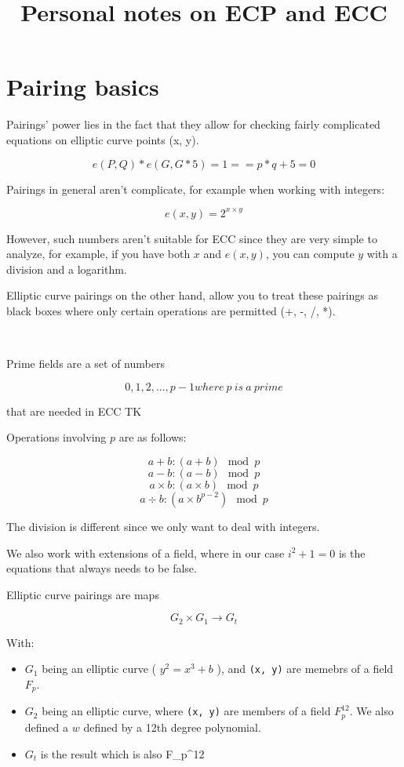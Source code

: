 \documentclass{article}
\title{Personal notes on ECP and ECC}
\newcommand{\inl}[1]{\lstinline{#1}}
\begin{document}
\maketitle


\section{Pairing basics}

Pairings' power lies in the fact that they allow for checking fairly complicated equations on elliptic curve points (x, y).

\[e (P, Q) * e (G, G * 5) = 1 == p * q + 5 = 0 \]

Pairings in general aren't complicate, for example when working with integers:

\[ e (x, y) = 2^{ x \times y } \]

However, such numbers aren't suitable for ECC since they are very simple to analyze, for example, if you have both \( x \) and \( e (x, y) \), you can compute \( y \) with a division and a logarithm.

Elliptic curve pairings on the other hand, allow you to treat these pairings as black boxes where only certain operations are permitted (+, -, /, *).

\

Prime fields are a set of numbers

\[ { 0, 1, 2, ..., p - 1 } where \ p \ is \ a \ prime \]

that are needed in ECC TK

Operations involving \( p \) are as follows:

\[ a + b:  (a + b) \mod p \]
\[ a - b:  (a - b) \mod p \]
\[ a \times b:  (a \times b) \mod p \]
\[ a \div b:  (a \times b^{p-2}) \mod p \]

The division is different since we only want to deal with integers.

We also work with extensions of a field, where in our case \( i ^ 2 + 1 = 0 \) is the equations that always needs to be false.


Elliptic curve pairings are maps

\[ G_2 \times G_1 \rightarrow G_t  \]

With:
\begin{itemize}
\item \( G_1 \) being an elliptic curve ( \( y^2 = x^3 + b \) ), and \inl{(x, y)} are memebrs of a field \( F_p \).
\item \( G_2 \) being an elliptic curve, where \inl{(x, y)} are members of a field \( F_p^{12} \). We also defined a \( w \) defined by a 12th degree polynomial.
\item \( G_t \) is the result which is also F_p^{12}
\end{itemize}
\end{document}

